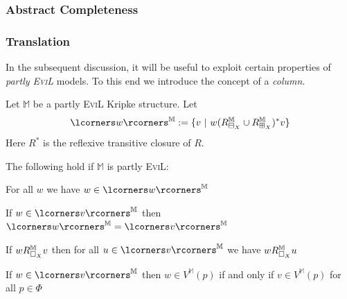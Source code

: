 \subsubsection{Abstract Completeness}
\label{Abstract-Completeness}

%
\subsubsection{Translation}\label{translation}

In the subsequent discussion, it will be useful to exploit certain properties of \emph{partly \textsc{EviL}} models.  To this end we introduce the concept of a \emph{column}.

\begin{mydef}Let $\mathbb{M}$ be a partly \textsc{EviL} Kripke structure.  Let
\[ \lcorners w\rcorners^\mathbb{M} := \{ v\ |\ w (R^{\mathbb{M}}_{\BB_X}\cup R^{\mathbb{M}}_{\BBI_X})^\ast v \}\]
Here $R^\ast$ is the reflexive transitive closure of $R$.
\end{mydef}

\begin{lemma}\label{column}
The following hold if $\mathbb{M}$ is partly \textsc{EviL}:
\begin{mynum}
	\item For all $w$ we have $w \in \lcorners w\rcorners^\mathbb{M}$
	\item If $w \in \lcorners v\rcorners^\mathbb{M}$ then $\lcorners w\rcorners^\mathbb{M} = \lcorners v\rcorners^\mathbb{M}$
	\item If $w R^\mathbb{M}_{\Box_X} v$ then for all $u \in \lcorners v\rcorners^\mathbb{M}$ we have $w R^\mathbb{M}_{\Box_X} u$
	\item If $w \in \lcorners v\rcorners^\mathbb{M}$ then $w\in V^\mathbb{M}(p)$ if and only if $v \in V^\mathbb{M}(p)$ for all $p \in \Phi$
\end{mynum}

\end{lemma}

